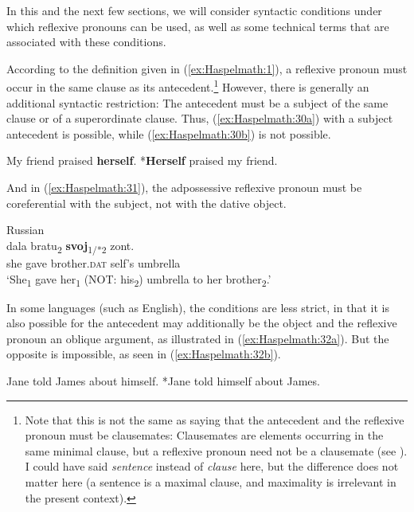 \documentclass[output=paper]{langscibook}
\begin{document}
In this and the next few sections, we will consider syntactic conditions under which reflexive pronouns can be used, as well as some technical terms that are associated with these conditions.

  According to the definition given in (\ref{ex:Haspelmath:1}), a reflexive pronoun must occur in the same clause as its antecedent.\footnote{ {Note that this is not the same as saying that the antecedent and the reflexive pronoun must be clausemates: Clausemates are elements occurring in the same minimal clause, but a reflexive pronoun need not be a clausemate (see ). I could have said} {\textit{sentence}} {instead of} {\textit{clause}} {here, but the difference does not matter here (a sentence is a maximal clause, and maximality is irrelevant in the present context).}} However, there is generally an additional syntactic restriction: The antecedent must be a subject of the same clause or of a superordinate clause. Thus, (\ref{ex:Haspelmath:30a}) with a subject antecedent is possible, while (\ref{ex:Haspelmath:30b}) is not possible.

\ea%
    \label{ex:Haspelmath:30}
    \ea  \label{ex:Haspelmath:30a}
   {My} {friend} {praised} \textbf{{herself}}.
    \ex  \label{ex:Haspelmath:30b}
     {*}\textbf{{Herself}} {praised} {my} {friend.}
    \z
\z 

And in (\ref{ex:Haspelmath:31}), the adpossessive reflexive pronoun must be coreferential with the subject, not with the dative object. 

\ea%
   Russian     \label{ex:Haspelmath:31}\\
      {dala}  {bratu\textsubscript{2}}  \textbf{{svoj}}{\textsubscript{1/*2}}  {zont.}\\
      she  gave  brother.\textsc{dat}  self’s  umbrella  \\
    \glt ‘She\textsubscript{1} gave her\textsubscript{1} (NOT: his\textsubscript{2}) umbrella to her brother\textsubscript{2}.’
    \z

In some languages (such as English), the conditions are less strict, in that it is also possible for the antecedent may additionally be the object and the reflexive pronoun an oblique argument, as illustrated in (\ref{ex:Haspelmath:32a}). But the opposite is impossible, as seen in (\ref{ex:Haspelmath:32b}).

\ea%
    \label{ex:Haspelmath:32}
    \ea \label{ex:Haspelmath:32a}
    {Jane} {told} {James} {about} {himself.}
    \ex  \label{ex:Haspelmath:32b}
     {*Jane} {told} {himself} {about} {James.}
    \z
\z 
\end{document}
